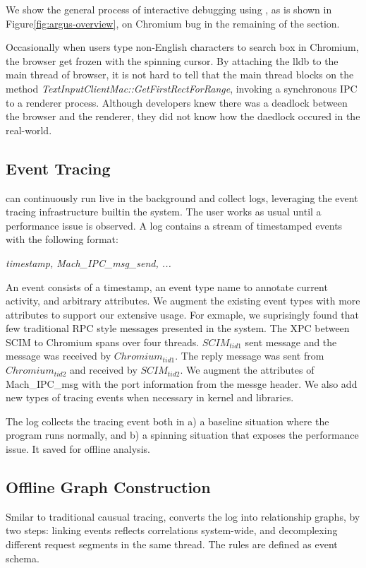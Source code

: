 We show the general process of interactive debugging using \xxx,
as is shown in Figure\ref{fig:argus-overview},
on Chromium bug in the remaining of the section.

Occasionally when users type non-English characters to search box in Chromium,
the browser get frozen with the spinning cursor.
By attaching the lldb to the main thread of browser, it is not hard to tell that
the main thread blocks on the method \textit{TextInputClientMac::GetFirstRectForRange},
invoking a synchronous IPC to a renderer process.
Although developers knew there was a deadlock between the browser and the renderer,
they did not know how the daedlock occured in the real-world.


\subsection{Event Tracing}

\xxx can continuously run live in the background and collect logs,
leveraging the event tracing infrastructure builtin the system.
The user works as usual until a performance issue is observed.
A log contains a stream of timestamped events with the following format:

\textit{timestamp, Mach\_IPC\_msg\_send, ...}

An event consists of a timestamp, an event type name to annotate current activity,
and arbitrary attributes.
We augment the existing event types with more attributes to support our extensive usage.
For exmaple, we suprisingly found that few traditional RPC style messages presented in the system.
The XPC between SCIM to Chromium spans over four threads.
$SCIM_{tid1}$ sent message and the message was received by $Chromium_{tid1}$.
The reply message was sent from $Chromium_{tid2}$ and received by $SCIM_{tid2}$.
We augment the attributes of Mach\_IPC\_msg with the port information from the messge header.
We also add new types of tracing events when necessary in kernel and libraries.

The log collects the tracing event both in 
a) a baseline situation where the program runs normally,
and b) a spinning situation that exposes the performance issue.
It saved for offline analysis.

\subsection{Offline Graph Construction}
Smilar to traditional causual tracing,
\xxx converts the log into relationship graphs,
by two steps:
linking events reflects correlations system-wide, 
and decomplexing different request segments in the same thread.
The rules are defined as event schema.

